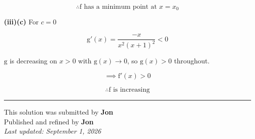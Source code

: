 \documentclass[12pt]{article}
\begin{document}
$$\therefore \boxed{\mathrm{f}\text{ has a minimum point at }x=x_0}$$

\textbf{(iii)(c)} For $c=0$

$$\mathrm{g}'(x)=\frac{-x}{x^2(x+1)^2}<0$$

$\mathrm{g}$ is decreasing on $x>0$ with $\mathrm{g}(x)\to0$, so $\mathrm{g}(x)>0$ throughout.

$$\implies \mathrm{f}'(x)>0$$

$$\therefore \boxed{\mathrm{f}\text{ is increasing}}$$

\bigskip
\hrule
\begin{center}
    This solution was submitted by \textbf{Jon}\\[4pt]
    Published and refined by \textbf{Jon}\\[8pt]
    \textit{Last updated: September 1, 2026}
\end{center}
\end{document}
